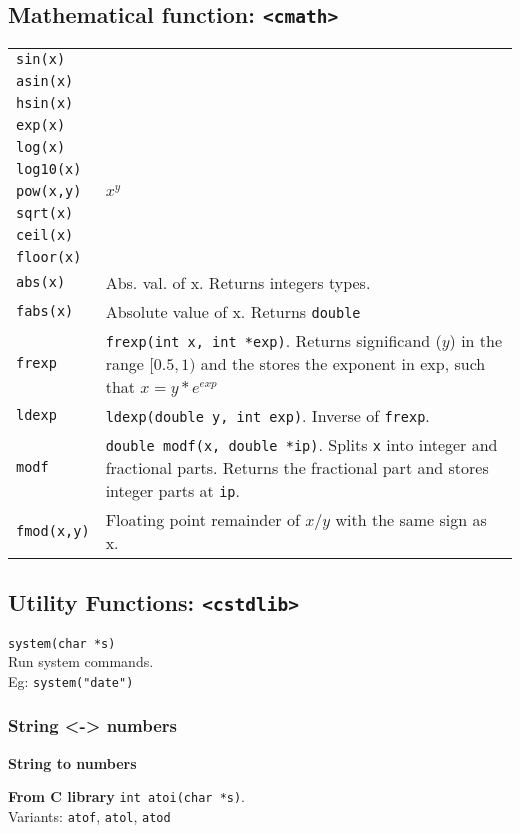 \subsection{Mathematical function: \texttt{<cmath>}}
\begin{tabularx}{\linewidth}{lX}
\texttt{sin(x)} & \\
\texttt{asin(x)} & \\
\texttt{hsin(x)} & \\
\texttt{exp(x)} & \\
\texttt{log(x)} & \\
\texttt{log10(x)} & \\
\texttt{pow(x,y)} & $x^y$\\
\texttt{sqrt(x)} & \\
\texttt{ceil(x)} & \\
\texttt{floor(x)} & \\
\texttt{abs(x)} & Abs. val. of x. Returns integers types. \\
\texttt{fabs(x)} & Absolute value of x. Returns \texttt{double}\\
\texttt{frexp} & \texttt{frexp(int x, int *exp)}. Returns significand ($y$) in the range $[0.5, 1)$ and the stores the exponent in exp, such that $x = y * e^{exp}$\\
\texttt{ldexp} & \texttt{ldexp(double y, int exp)}.	Inverse of \texttt{frexp}.\\
\texttt{modf} & \texttt{double modf(x, double *ip)}. Splits \texttt{x} into integer and fractional parts. Returns the fractional part and stores integer parts at \texttt{ip}. \\ 
\texttt{fmod(x,y)} & Floating point remainder of $x/y$ with the same sign as x.
\end{tabularx}

\subsection{Utility Functions: \texttt{<cstdlib>}}

\texttt{system(char *s)}\\
\qquad Run system commands.\\
\qquad Eg: \texttt{system("date")}\\


\subsubsection{String <-> numbers}

\begin{center}
    \textbf{String to numbers}
\end{center}
\textbf{From C library}
\texttt{int atoi(char *s)}.\\ 
Variants: \texttt{atof}, \texttt{atol}, \texttt{atod} \\

